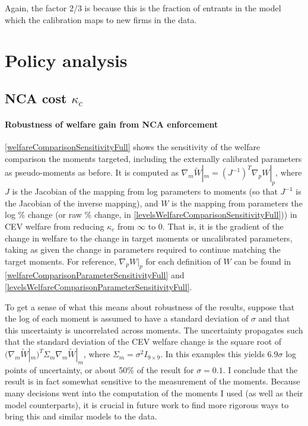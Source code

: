 \documentclass[11pt,english]{article}
\begin{document}
Again, the factor 2/3 is because this is the fraction of entrants in the model which the calibration maps to new firms in the data.

\section{Policy analysis}

\subsection{NCA cost $\kappa_c$}\label{appendix:policyanalysis:ncacost}

\paragraph{Robustness of welfare gain from NCA enforcement}

\autoref{welfareComparisonSensitivityFull} shows the sensitivity of the welfare comparison the moments targeted, including the externally calibrated parameters as pseudo-moments as before. It is computed as $\nabla_m \tilde{W}|_m = (J^{-1})^T \nabla_p W|_p$, where $J$ is the Jacobian of the mapping from log parameters to moments (so that $J^{-1}$ is the Jacobian of the inverse mapping), and $W$ is the mapping from parameters the log \% change (or raw \% change, in \autoref{levelsWelfareComparisonSensitivityFull})) in CEV welfare from reducing $\kappa_c$ from $\infty$ to $0$. That is, it is the gradient of the change in welfare to the change in target moments or uncalibrated parameters, taking as given the change in parameters required to continue matching the target moments. For reference, $\nabla_p W|_p$  for each definition of $W$ can be found in \autoref{welfareComparisonParameterSensitivityFull} and \autoref{levelsWelfareComparisonParameterSensitivityFull}.

To get a sense of what this means about robustness of the results, suppose that the log of each moment is assumed to have a standard deviation of $\sigma$ and that this uncertainty is uncorrelated across moments. The uncertainty propagates such that the standard deviation of the CEV welfare change is the square root of $(\nabla_m \tilde{W}|_m)^T \Sigma_m \nabla_m \tilde{W}|_m$, where $\Sigma_m = \sigma^2 I_{9\times 9}$. In this examples this yields 6.9$\sigma$ log points of uncertainty, or about 50\% of the result for $\sigma = 0.1$. I conclude that the result is in fact somewhat sensitive to the measurement of the moments. Because many decisions went into the computation of the moments I used (as well as their model counterparts), it is crucial in future work to find more rigorous ways to bring this and similar models to the data.
\end{document}
